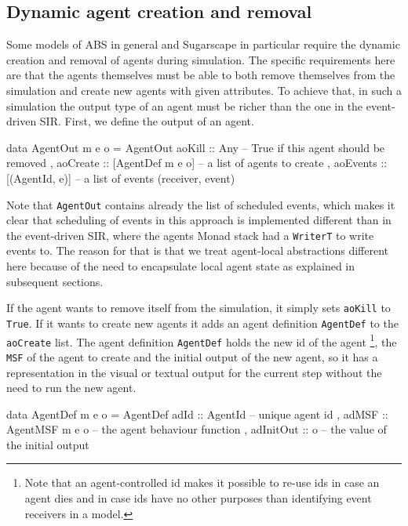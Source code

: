 \subsection{Dynamic agent creation and removal}
\label{sec:dynamic_creationremoval}
Some models of ABS in general and Sugarscape in particular require the dynamic creation and removal of agents during simulation. The specific requirements here are that the agents themselves must be able to both remove themselves from the simulation and create new agents with given attributes. To achieve that, in such a simulation the output type of an agent must be richer than the one in the event-driven SIR. First, we define the output of an agent.

\begin{HaskellCode}
data AgentOut m e o = AgentOut
  { aoKill   :: Any              -- True if this agent should be removed 
  , aoCreate :: [AgentDef m e o] -- a list of agents to create
  , aoEvents :: [(AgentId, e)]   -- a list of events (receiver, event)
  }
\end{HaskellCode}

Note that \texttt{AgentOut} contains already the list of scheduled events, which makes it clear that scheduling of events in this approach is implemented different than in the event-driven SIR, where the agents Monad stack had a \texttt{WriterT} to write events to. The reason for that is that we treat agent-local abstractions different here because of the need to encapsulate local agent state as explained in subsequent sections.

If the agent wants to remove itself from the simulation, it simply sets \texttt{aoKill} to \texttt{True}. If it wants to create new agents it adds an agent definition \texttt{AgentDef} to the \texttt{aoCreate} list. The agent definition \texttt{AgentDef} holds the new id of the agent \footnote{Note that an agent-controlled id makes it possible to re-use ids in case an agent dies and in case ids have no other purposes than identifying event receivers in a model.}, the \texttt{MSF} of the agent to create and the initial output of the new agent, so it has a representation in the visual or textual output for the current step without the need to run the new agent.

\begin{HaskellCode}
data AgentDef m e o = AgentDef
  { adId      :: AgentId         -- unique agent id
  , adMSF     :: AgentMSF m e o  -- the agent behaviour function
  , adInitOut :: o               -- the value of the initial output
  }
\end{HaskellCode}

